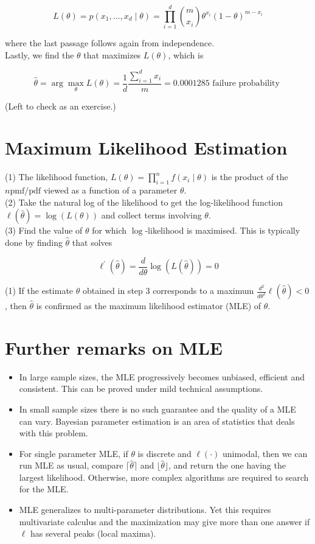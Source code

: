 \documentclass[10pt]{article}
\begin{document}
$$
L(\theta)=p\left(x_{1}, \ldots, x_{d} \mid \theta\right)=\prod_{i=1}^{d}\binom{m}{x_{i}} \theta^{x_{i}}(1-\theta)^{m-x_{i}}
$$

where the last passage follows again from independence.\\
Lastly, we find the $\theta$ that maximizes $L(\theta)$, which is

$$
\widehat{\theta}=\arg \max _{\theta} L(\theta)=\frac{1}{d} \frac{\sum_{i=1}^{d} x_{i}}{m}=0.0001285 \text { failure probability }
$$

(Left to check as an exercise.)

\section*{Maximum Likelihood Estimation}
(1) The likelihood function, $L(\theta)=\prod_{i=1}^{n} f\left(x_{i} \mid \theta\right)$ is the product of the $n \mathrm{pmf} / \mathrm{pdf}$ viewed as a function of a parameter $\theta$.\\
(2) Take the natural log of the likelihood to get the log-likelihood function $\ell(\hat{\theta})=\log (L(\theta))$ and collect terms involving $\theta$.\\
(3) Find the value of $\theta$ for which $\log$-likelihood is maximised. This is typically done by finding $\hat{\theta}$ that solves

$$
\ell^{\prime}(\hat{\theta})=\frac{d}{d \theta} \log (L(\hat{\theta}))=0
$$

(1) If the estimate $\hat{\theta}$ obtained in step 3 corresponds to a maximum $\frac{d^{2}}{d \theta^{2}} \ell(\hat{\theta})<0$, then $\hat{\theta}$ is confirmed as the maximum likelihood estimator (MLE) of $\theta$.

\section*{Further remarks on MLE}
\begin{itemize}
  \item In large sample sizes, the MLE progressively becomes unbiased, efficient and consistent. This can be proved under mild technical assumptions.
  \item In small sample sizes there is no such guarantee and the quality of a MLE can vary. Bayesian parameter estimation is an area of statistics that deals with this problem.
  \item For single parameter MLE, if $\theta$ is discrete and $\ell(\cdot)$ unimodal, then we can run MLE as usual, compare $\lceil\hat{\theta}\rceil$ and $\lfloor\hat{\theta}\rfloor$, and return the one having the largest likelihood. Otherwise, more complex algorithms are required to search for the MLE.
  \item MLE generalizes to multi-parameter distributions. Yet this requires multivariate calculus and the maximization may give more than one answer if $\ell$ has several peaks (local maxima).
\end{itemize}
\end{document}
